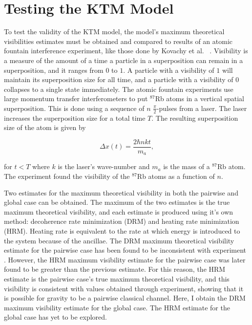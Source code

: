\documentclass[aps, prd, superscriptaddress,twocolumn,amsmath,amssymb,nofootinbib]{revtex4-1}
\newcommand{\beq}{\begin{equation}}
\newcommand{\eeq}{\end{equation}}
\begin{document}

\section{Testing the KTM Model}

To test the validity of the KTM model, the model's maximum theoretical visibilities estimates must be obtained and compared to results of an atomic fountain interference experiment, like those done by Kovachy et al. ~\cite{kovachy}. Visibility is a measure of the amount of a time a particle in a superposition can remain in a superposition, and it ranges from $0$ to $1$. A particle with a visibility of $1$ will maintain its superposition size for all time, and a particle with a visibility of $0$ collapses to a single state immediately. The atomic fountain experiments use large momentum transfer interferometers to put $^{87}$Rb atoms in a vertical spatial superposition. This is done using a sequence of $n$ $\frac{\pi}{2}$-pulses from a laser. The laser increases the superposition size for a total time $T$. The resulting superposition size of the atom is given by

\beq
\Delta x(t)=\frac{2\hbar n k  t}{m_a},
 \label{SP_size}
 \eeq
 
 for $t<T$ where $k$ is the laser's wave-number and $m_a$ is the mass of a $^{87}$Rb atom. The experiment found the visibility of the $^{87}$Rb atoms as a function of $n$.
 
Two estimates for the maximum theoretical visibility in both the pairwise and global case can be obtained. The maximum of the two estimates is the true maximum theoretical visibility, and each estimate is produced using it's own method: decoherence rate minimization (DRM) and heating rate minimization (HRM). Heating rate is equivalent to the rate at which energy is introduced to the system because of the ancillae. The DRM maximum theoretical visibility estimate for the pairwise case has been found to be inconsistent with experiment \cite{P3}. However, the HRM maximum visibility estimate for the pairwise case was later found to be greater than the previous estimate. For this reason, the HRM estimate is the pairwise case's true maximum theoretical visibility, and this visibility is consistent with values obtained through experiment, showing that it is possible for gravity to be a pairwise classical channel. Here, I obtain the DRM maximum visibility estimate for the global case. The HRM estimate for the global case has yet to be explored.
\end{document}
